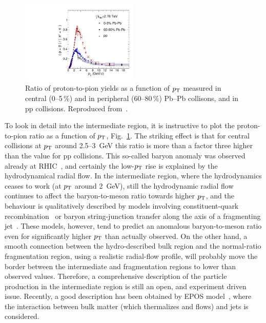 \begin{figure}
\centering
\includegraphics[width=0.5\textwidth]{ksfigures/ProtonToPion.pdf}
\caption{Ratio of proton-to-pion yields as a function of $p_{\rm T}$ measured in central (0--5\,\%) and in peripheral (60--80\,\%) Pb--Pb collisons, and in pp collisions. Reproduced from~\cite{Abelev:2014laa}.}
\label{figks:ProtonToPion}
\end{figure}

To look in detail into the intermediate region, it is instructive to plot the proton-to-pion ratio as a function of $p_{\rm T}$, Fig.~\ref{figks:ProtonToPion}. The striking effect is that for central collisions at $p_{\rm T}$ around 2.5--3~GeV this ratio is more than a factor three higher than the value for pp collisions. This so-called baryon anomaly was observed already at RHIC~\cite{Abelev:2006jr,Adare:2013esx}, and certainly the low-$p_{\rm T}$ rise is explained by the hydrodynamical radial flow. In the intermediate region, where the hydrodynamics ceases to work (at $p_{\rm T}$ around 2~GeV), still the hydrodynamic radial flow continues to affect the baryon-to-meson ratio towards higher $p_{\rm T}$, and the behaviour is qualitatively described by models involving constituent-quark recombination~\cite{Fries:2003kq} or baryon string-junction transfer along the axis of a fragmenting jet~\cite{Aurenche:2011rd}. These models, however, tend to predict an anomalous baryon-to-meson ratio even for significantly higher $p_{\rm T}$ than actually observed. On the other hand, a smooth connection between the hydro-described bulk region and the normal-ratio fragmentation region, using a realistic radial-flow profile, will probably move the border between the intermediate and fragmentation regions to lower than observed values. Therefore, a comprehensive description of the particle production in the intermediate region is still an open, and experiment driven issue. Recently, a good description has been obtained
by EPOS model~\cite{Werner:2012xh}, where the interaction between bulk matter (which thermalizes and flows) and jets is considered.

